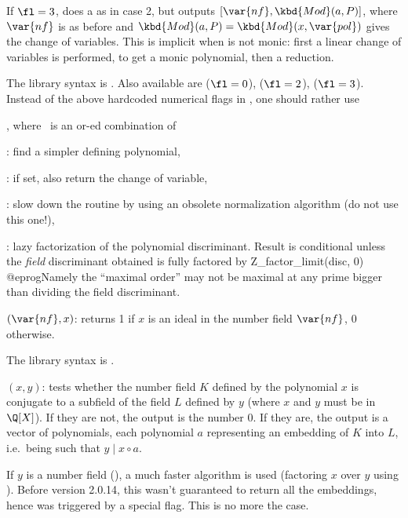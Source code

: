 If $\fl=3$, does a  as in case 2, but outputs
$[\var{nf},\kbd{Mod}(a,P)]$, where $\var{nf}$ is as before and
$\kbd{Mod}(a,P)=\kbd{Mod}(x,\var{pol})$ gives the change of
variables. This is implicit when  is not monic: first a linear change
of variables is performed, to get a monic polynomial, then a 
reduction.

The library syntax is .
Also available are
 ($\fl = 0$),
 ($\fl = 2$),
 ($\fl = 3$).
Instead of the above hardcoded numerical flags in , one should
rather use

, where \fl\ is an
or-ed combination of

\item {}: find a simpler defining polynomial,

\item {}: if  set, also return the change of variable,

\item {}: slow down the routine by using an obsolete
normalization algorithm (do not use this one!),

\item {}: lazy factorization of the polynomial discriminant.
Result is conditional unless the \emph{field} discriminant obtained
is fully factored by
\bprog
  Z_factor_limit(disc, 0)
@eprog\noindent Namely the ``maximal order'' may not be maximal at any prime
bigger than  dividing the field discriminant.

$(\var{nf},x)$: \label{se:nfisideal}returns 1 if $x$ is an ideal in the number field $\var{nf}$, 0 otherwise.

The library syntax is .

$(x,y)$: \label{se:nfisincl}tests whether the number field $K$ defined
by the polynomial $x$ is conjugate to a subfield of the field $L$ defined
by $y$ (where $x$ and $y$ must be in $\Q[X]$). If they are not, the output
is the number 0. If they are, the output is a vector of polynomials, each
polynomial $a$ representing an embedding of $K$ into $L$, i.e.~being such
that $y\mid x\circ a$.

If $y$ is a number field (), a much faster algorithm is used
(factoring $x$ over $y$ using ). Before version 2.0.14, this
wasn't guaranteed to return all the embeddings, hence was triggered by a
special flag. This is no more the case.

